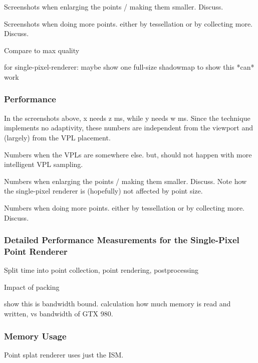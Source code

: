 Screenshots when enlarging the points / making them smaller. Discuss.

Screenshots when doing more points. either by tessellation or by collecting more. Discuss.


Compare to max quality


for single-pixel-renderer: maybe show one full-size shadowmap to show this *can* work


\subsubsection{Performance}

In the screenshots above, x needs z ms, while y needs w ms. Since the technique implements no adaptivity, these numbers are independent from the viewport and (largely) from the VPL placement.

Numbers when the VPLs are somewhere else. but, should not happen with more intelligent VPL sampling.

Numbers when enlarging the points / making them smaller. Discuss. Note how the single-pixel renderer is (hopefully) not affected by point size.

Numbers when doing more points. either by tessellation or by collecting more. Discuss.


\subsubsection{Detailed Performance Measurements for the Single-Pixel Point Renderer}

Split time into point collection, point rendering, postprocessing

Impact of packing

show this is bandwidth bound. calculation how much memory is read and written, vs bandwidth of GTX 980.


\subsubsection{Memory Usage}

Point splat renderer uses just the ISM.

